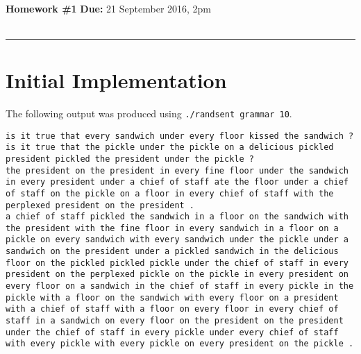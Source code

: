 \documentclass[11pt]{article}
\newcommand{\code}[1]{\texttt{#1}}
\begin{document}
\\
{{\bf Homework \#1}} \hfill {{\bf Due:} 21 September 2016, 2pm} \\ \\
\rule[0.1in]{\textwidth}{0.4pt}
	
\section{Initial Implementation}
	The following output was produced using \code{./randsent grammar 10}.
	
	\begin{lstlisting}
is it true that every sandwich under every floor kissed the sandwich ?
is it true that the pickle under the pickle on a delicious pickled president pickled the president under the pickle ?
the president on the president in every fine floor under the sandwich in every president under a chief of staff ate the floor under a chief of staff on the pickle on a floor in every chief of staff with the perplexed president on the president .
a chief of staff pickled the sandwich in a floor on the sandwich with the president with the fine floor in every sandwich in a floor on a pickle on every sandwich with every sandwich under the pickle under a sandwich on the president under a pickled sandwich in the delicious floor on the pickled pickled pickle under the chief of staff in every president on the perplexed pickle on the pickle in every president on every floor on a sandwich in the chief of staff in every pickle in the pickle with a floor on the sandwich with every floor on a president with a chief of staff with a floor on every floor in every chief of staff in a sandwich on every floor on the president on the president under the chief of staff in every pickle under every chief of staff with every pickle with every pickle on every president on the pickle .

\end{lstlisting}
\end{document}
